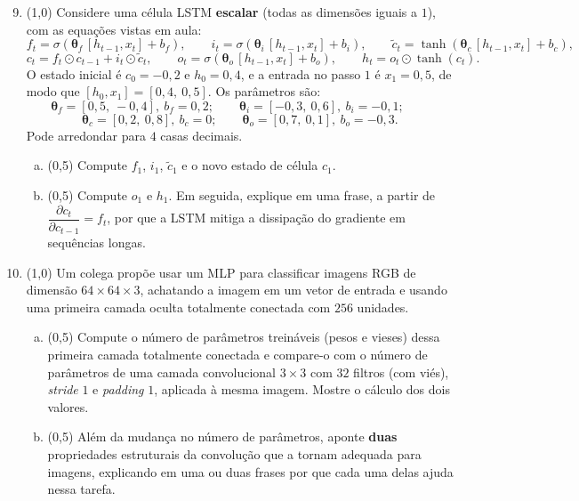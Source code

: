 \documentclass[11pt,a4paper]{article}
\begin{document}
\begin{enumerate}[1)]
\setcounter{enumi}{8}

\item (1{,}0) Considere uma célula LSTM \textbf{escalar} (todas as dimensões iguais a $1$), com as equações vistas em aula:
\[
f_t = \sigma(\boldsymbol{\theta}_f\,[h_{t-1}, x_t] + b_f), \qquad
i_t = \sigma(\boldsymbol{\theta}_i\,[h_{t-1}, x_t] + b_i), \qquad
\tilde{c}_t = \tanh(\boldsymbol{\theta}_c\,[h_{t-1}, x_t] + b_c),
\]
\[
c_t = f_t \odot c_{t-1} + i_t \odot \tilde{c}_t, \qquad
o_t = \sigma(\boldsymbol{\theta}_o\,[h_{t-1}, x_t] + b_o), \qquad
h_t = o_t \odot \tanh(c_t).
\]
O estado inicial é $c_0 = -0{,}2$ e $h_0 = 0{,}4$, e a entrada no passo $1$ é $x_1 = 0{,}5$, de modo que $[h_0, x_1] = [0{,}4,\ 0{,}5]$. Os parâmetros são:
\[
\boldsymbol{\theta}_f = [0{,}5,\ -0{,}4],\ b_f = 0{,}2; \qquad
\boldsymbol{\theta}_i = [-0{,}3,\ 0{,}6],\ b_i = -0{,}1; \qquad
\]
\[
\boldsymbol{\theta}_c = [0{,}2,\ 0{,}8],\ b_c = 0; \qquad
\boldsymbol{\theta}_o = [0{,}7,\ 0{,}1],\ b_o = -0{,}3.
\]
Pode arredondar para $4$ casas decimais.

\begin{enumerate}[a)]
    \item (0{,}5) Compute $f_1$, $i_1$, $\tilde{c}_1$ e o novo estado de célula $c_1$.
    \vspace{3.4cm}

    \item (0{,}5) Compute $o_1$ e $h_1$. Em seguida, explique em uma frase, a partir de $\dfrac{\partial c_t}{\partial c_{t-1}} = f_t$, por que a LSTM mitiga a dissipação do gradiente em sequências longas.
    \vspace{3.4cm}
\end{enumerate}

\item (1{,}0) Um colega propõe usar um MLP para classificar imagens RGB de dimensão $64 \times 64 \times 3$, achatando a imagem em um vetor de entrada e usando uma primeira camada oculta totalmente conectada com $256$ unidades.

\begin{enumerate}[a)]
    \item (0{,}5) Compute o número de parâmetros treináveis (pesos e vieses) dessa primeira camada totalmente conectada e compare-o com o número de parâmetros de uma camada convolucional $3 \times 3$ com $32$ filtros (com viés), \textit{stride} $1$ e \textit{padding} $1$, aplicada à mesma imagem. Mostre o cálculo dos dois valores.
    \vspace{3.4cm}

    \item (0{,}5) Além da mudança no número de parâmetros, aponte \textbf{duas} propriedades estruturais da convolução que a tornam adequada para imagens, explicando em uma ou duas frases por que cada uma delas ajuda nessa tarefa.
    \vspace{3.4cm}
\end{enumerate}

\end{enumerate}
\end{document}
